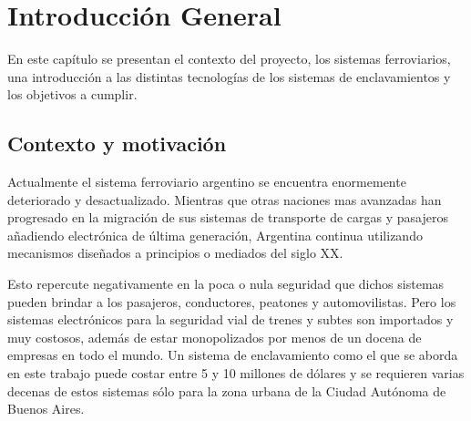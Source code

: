 
\chapter{Introducción General} %

\label{Chapter1} %
\label{IntroGeneral}


\newcommand{\keyword}[1]{\textbf{#1}}
\newcommand{\tabhead}[1]{\textbf{#1}}
\newcommand{\code}[1]{\texttt{#1}}
\newcommand{\file}[1]{\texttt{\bfseries#1}}
\newcommand{\option}[1]{\texttt{\itshape#1}}
\newcommand{\grados}{$^{\circ}$}


En este capítulo se presentan el contexto del proyecto, los sistemas ferroviarios, una introducción a las distintas tecnologías de los sistemas de enclavamientos y los objetivos a cumplir.

		
	\section{Contexto y motivación}
	
		Actualmente el sistema ferroviario argentino se encuentra enormemente deteriorado y desactualizado. Mientras que otras naciones mas avanzadas han progresado en la migración de sus sistemas de transporte de cargas y pasajeros añadiendo electrónica de última generación, Argentina continua utilizando mecanismos diseñados a principios o mediados del siglo XX.
		
		
		Esto repercute negativamente en la poca o nula seguridad que dichos sistemas pueden brindar a los pasajeros, conductores, peatones y automovilistas. Pero los sistemas electrónicos para la seguridad vial de trenes y subtes son importados y muy costosos, además de estar monopolizados por menos de un docena de empresas en todo el mundo. Un sistema de enclavamiento como el que se aborda en este trabajo puede costar entre 5 y 10 millones de dólares\citep{SIEMENS} y se requieren varias decenas de estos sistemas sólo para la zona urbana de la Ciudad Autónoma de Buenos Aires.
		
